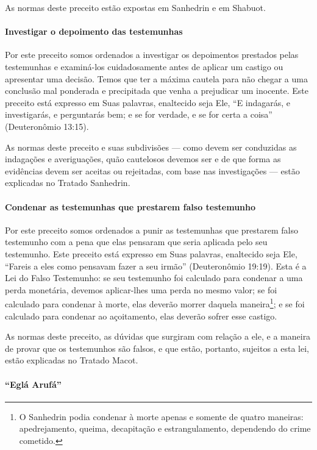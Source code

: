 As normas deste preceito estão expostas em Sanhedrin e em Shabuot.

\paragraph{Investigar o depoimento das testemunhas}

Por este preceito somos ordenados a investigar os depoimentos prestados
pelas testemunhas e examiná-los cuidadosamente antes de aplicar um
castigo ou apresentar uma decisão. Temos que ter a máxima cautela para
não chegar a uma conclusão mal ponderada e precipitada que venha a
prejudicar um inocente. Este preceito está expresso em Suas palavras,
enaltecido seja Ele, ``E indagarás, e investigarás, e perguntarás bem; e
se for verdade, e se for certa a coisa'' (Deuteronômio 13:15).

As normas deste preceito e suas subdivisões --- como devem ser
conduzidas as indagações e averiguações, quão cautelosos devemos ser e
de que forma as evidências devem ser aceitas ou rejeitadas, com base nas
investigações --- estão explicadas no Tratado Sanhedrin.

\paragraph{Condenar as testemunhas que prestarem falso testemunho}

Por este preceito somos ordenados a punir as testemunhas que prestarem
falso testemunho com a pena que elas pensaram que seria aplicada pelo
seu testemunho. Este preceito está expresso em Suas palavras, enaltecido
seja Ele, ``Fareis a eles como pensavam fazer a seu irmão''
(Deuteronômio 19:19). Esta é a Lei do Falso Testemunho: se seu
testemunho foi calculado para condenar a uma perda monetária, devemos aplicar-lhes uma perda no mesmo valor;
se foi calculado para condenar à morte, elas deverão morrer daquela
maneira\footnote{O Sanhedrin podia condenar à morte apenas e somente de quatro
maneiras: apedrejamento, queima, decapitação e estrangulamento,
dependendo do crime cometido.};
e se foi calculado para condenar ao açoitamento, elas deverão sofrer
esse castigo.

As normas deste preceito, as dúvidas que surgiram com relação a ele, e a
maneira de provar que os testemunhos são falsos, e que estão, portanto,
sujeitos a esta lei, estão explicadas no Tratado Macot.


\paragraph{``Eglá Arufá''}

